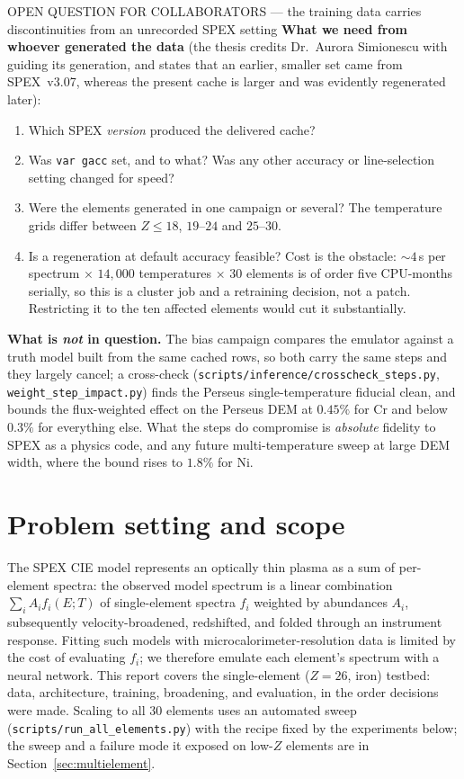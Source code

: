 \documentclass[11pt,a4paper]{article}
\newcommand{\code}[1]{\texttt{#1}}
\begin{document}
\begin{collabquestion}{OPEN QUESTION FOR COLLABORATORS --- the training data
carries discontinuities from an unrecorded SPEX setting}
\textbf{What we need from whoever generated the data} (the thesis credits
Dr.~Aurora Simionescu with guiding its generation, and states that an earlier,
smaller set came from SPEX~v3.07, whereas the present cache is larger and was
evidently regenerated later):
\begin{enumerate}\itemsep2pt
  \item Which SPEX \emph{version} produced the delivered cache?
  \item Was \code{var gacc} set, and to what? Was any other accuracy or
    line-selection setting changed for speed?
  \item Were the elements generated in one campaign or several? The
    temperature grids differ between $Z\!\le\!18$, $19$--$24$ and $25$--$30$.
  \item Is a regeneration at default accuracy feasible? Cost is the obstacle:
    $\sim\!4$\,s per spectrum $\times$ $14{,}000$ temperatures $\times$ 30
    elements is of order five CPU-months serially, so this is a cluster job and
    a retraining decision, not a patch. Restricting it to the ten affected
    elements would cut it substantially.
\end{enumerate}

\textbf{What is \emph{not} in question.} The bias campaign compares the
emulator against a truth model built from the same cached rows, so both carry
the same steps and they largely cancel; a cross-check
(\code{scripts/inference/crosscheck\_steps.py},
\code{weight\_step\_impact.py}) finds the Perseus single-temperature fiducial
clean, and bounds the flux-weighted effect on the Perseus DEM at $0.45\%$ for
Cr and below $0.3\%$ for everything else. What the steps do compromise is
\emph{absolute} fidelity to SPEX as a physics code, and any future
multi-temperature sweep at large DEM width, where the bound rises to $1.8\%$
for Ni.
\end{collabquestion}

\section{Problem setting and scope}
\label{sec:setting}

The SPEX CIE model represents an optically thin plasma as a sum of
per-element spectra: the observed model spectrum is a linear combination
$\sum_i A_i f_i(E; T)$ of single-element spectra $f_i$ weighted by
abundances $A_i$, subsequently velocity-broadened, redshifted, and
folded through an instrument response. Fitting such models with
microcalorimeter-resolution data is limited by the cost of evaluating
$f_i$; we therefore emulate each element's spectrum with a neural
network. This report covers the single-element ($Z=26$, iron) testbed:
data, architecture, training, broadening, and evaluation, in the order
decisions were made. Scaling to all 30 elements uses an automated sweep
(\code{scripts/run\_all\_elements.py}) with the recipe fixed by the
experiments below; the sweep and a failure mode it exposed on low-$Z$
elements are in Section~\ref{sec:multielement}.
\end{document}

